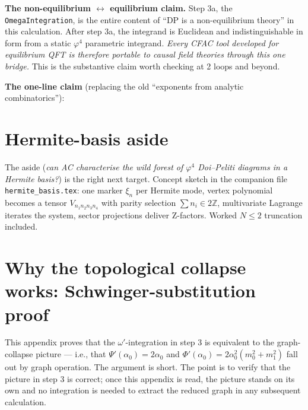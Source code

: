 \documentclass[11pt,a4paper]{article}
\begin{document}
\noindent\textbf{The non-equilibrium $\leftrightarrow$ equilibrium claim.} Step 3a, the
\texttt{OmegaIntegration}, is the entire content of ``DP is a non-equilibrium theory'' in
this calculation. After step 3a, the integrand is Euclidean and indistinguishable in form
from a static $\varphi^{4}$ parametric integrand. \emph{Every CFAC tool developed for
equilibrium QFT is therefore portable to causal field theories through this one
bridge.} This is the substantive claim worth checking at 2 loops and beyond.

\noindent
\textbf{The one-line claim} (replacing the old ``exponents from analytic combinatorics''):
\begin{center}
\end{center}

\section*{Hermite-basis aside}

The aside (\emph{can AC characterise the wild forest of $\varphi^{4}$ Doi--Peliti diagrams in
a Hermite basis?}) is the right next target. Concept sketch in the companion file
\texttt{hermite\_basis.tex}: one marker $\xi_{n}$ per Hermite mode, vertex polynomial
becomes a tensor $V_{n_{1}n_{2}n_{3}n_{4}}$ with parity selection
$\sum n_{i}\in 2\mathbb Z$, multivariate Lagrange iterates the system, sector projections
deliver Z-factors. Worked $N\le 2$ truncation included.

\appendix

\section{Why the topological collapse works: Schwinger-substitution proof}

\label{app:omega-collapse}

This appendix proves that the $\omega'$-integration in step 3 is equivalent to the
graph-collapse picture --- i.e., that $\Psi'(\alpha_{0}) = 2\alpha_{0}$ and
$\Phi'(\alpha_{0}) = 2\alpha_{0}^{2}(m_{0}^{2}+m_{1}^{2})$ fall out by graph operation.
The argument is short. The point is to verify that the picture in step 3 is correct;
once this appendix is read, the picture stands on its own and no integration is needed
to extract the reduced graph in any subsequent calculation.
\end{document}
